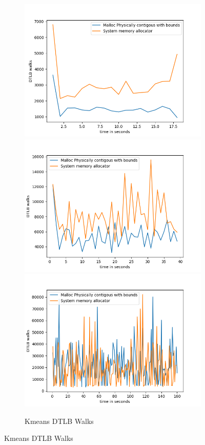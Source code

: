 \begin{figure}
  \begin{subfigure}{\linewidth}
  \includegraphics[width=.5\linewidth]{BenchmarkRuns/Kmeans/dtlb_walk_kmeans_3_dimentions.png}\hfill
  \includegraphics[width=.5\linewidth]{BenchmarkRuns/Kmeans/dtlb_walk_kmeans_6_dimentions.png}\hfill
  \includegraphics[width=.5\linewidth]{BenchmarkRuns/Kmeans/d_tlb_walk_40_dimentions.png}
  \caption{Kmeans DTLB Walks}
\end{subfigure}
\end{figure}

